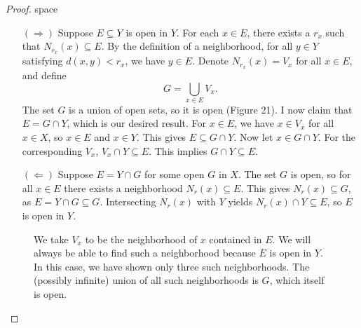 \documentclass{article}
\theoremstyle{definition}
\begin{document}
	\begin{proof}{\color{white}space}
		\begin{enumerate}
			\item[$ (\Longrightarrow) $] Suppose $ E\subseteq Y $ is open in $ Y $. For each $ x\in E $, there exists a $ r_x $ such that $ N_{r_x}(x)\subseteq E $. By the definition of a neighborhood, for all $ y\in Y $ satisfying $ d(x,y)<r_x $, we have $ y\in E $. Denote $ N_{r_x}(x)=V_x $ for all $ x\in E $, and define $$G=\bigcup_{x\in E}V_x .$$ The set $ G $ is a union of open sets, so it is open (Figure 21). I now claim that $ E=G\cap Y $, which is our desired result. For $ x\in E $, we have $ x\in V_x $ for all $ x\in X $, so $ x\in E $ and $ x\in Y $. This gives $ E\subseteq G\cap Y $. Now let $ x\in G\cap Y $. For the corresponding $ V_x $, $ V_x\cap Y\subseteq E $. This implies $ G\cap Y\subseteq E $.    
			\item[$ (\Longleftarrow) $] Suppose $ E=Y\cap G $ for some open $ G $ in $ X $. The set $ G $ is open, so for all $ x\in E $ there exists a neighborhood $ N_r(x)\subseteq E $. This gives $ N_r(x)\subseteq G $, as $ E=Y\cap G\subseteq G $. Intersecting $ N_r(x) $ with $ Y $ yields $ N_r(x)\cap Y\subseteq E $, so $ E $ is open in $ Y $.  
		\end{enumerate}	
		\begin{figure}[h!]
			\centering
			\caption{We take $ V_x $ to be the neighborhood of $ x $ contained in $ E $. We will always be able to find such a neighborhood because $ E $ is open in $ Y $. In this case, we have shown only three such neighborhoods. The (possibly infinite) union of all such neighborhoods is $ G $, which itself is open.}  
		\end{figure}
	\end{proof}
\end{document}
